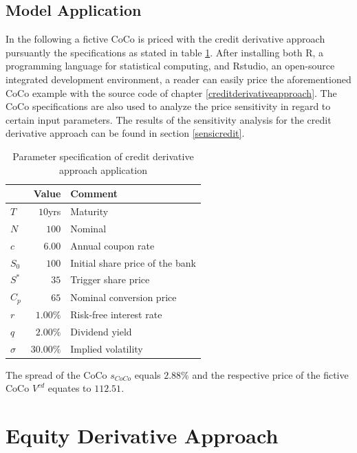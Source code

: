 \subsection{Model Application}

In the following a fictive CoCo is priced with the credit derivative approach pursuantly the specifications as stated in table \ref{creditcoco}. After installing both R, a programming language for statistical computing, and Rstudio, an open-source integrated development environment, a reader can easily price the aforementioned CoCo example with the source code of chapter \ref{creditderivativeapproach}. The CoCo specifications are also used to analyze the price sensitivity in regard to certain input parameters. The results of the sensitivity analysis for the credit derivative approach can be found in section \ref{sensicredit}.

\begin{table}[H]
	\setlength{\extrarowheight}{2.5pt}
	\centering
	\begin{tabular}{lrl}
		\toprule
			 & \textbf{Value} & \textbf{Comment} \\
		\midrule
			$T$ & $10$yrs & Maturity \\
			$N$ & $100$ & Nominal \\			
			$c$ & $6.00$ & Annual coupon rate \\
			$S_0$ & $100$ & Initial share price of the bank \\
			$S^*$ & $35$ & Trigger share price \\
			$C_p$ & $65$ & Nominal conversion price \\
			$r$ & $1.00 \%$ & Risk-free interest rate\\
			$q$ & $2.00\%$ & Dividend yield \\
			$\sigma$& $30.00 \%$ & Implied volatility \\
		\bottomrule
	\end{tabular}
	\caption[Parameter specification of credit derivative approach application]{Parameter specification of credit derivative approach application \citep{alvemar2012modelling}}
	\label{creditcoco}
\end{table}

The spread of the CoCo $s_{CoCo}$ equals $2.88\%$ and the respective price of the fictive CoCo $V^{cd}$ equates to $112.51$.

\section{Equity Derivative Approach} \label{sec:equityderivativeapproach}

